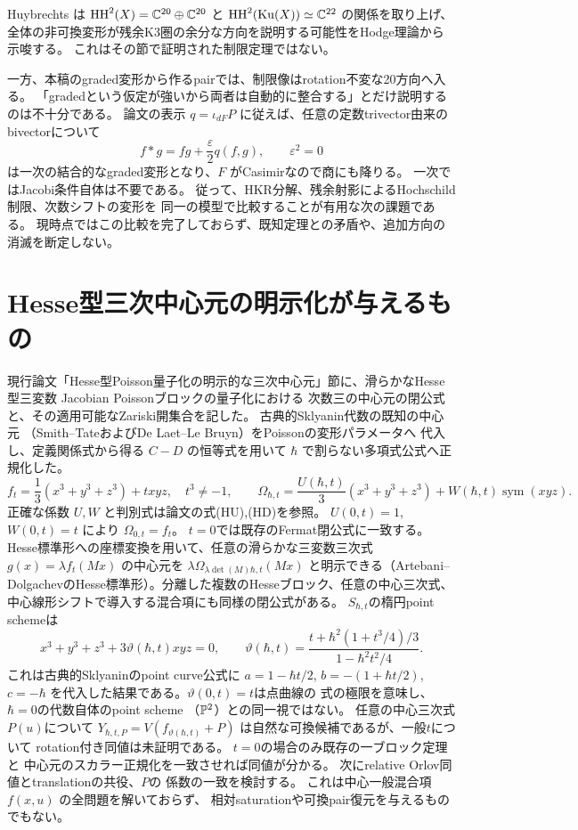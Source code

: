 Huybrechts \cite[Section 9]{HuyUpdate} は
\(\operatorname{HH}^2(X)=\mathbb C^{20}\oplus\mathbb C^{20}\) と
\(\operatorname{HH}^2(\operatorname{Ku}(X))\simeq\mathbb C^{22}\) の関係を取り上げ、
全体の非可換変形が残余K3圏の余分な方向を説明する可能性をHodge理論から示唆する。
これはその節で証明された制限定理ではない。

一方、本稿のgraded変形から作るpairでは、制限像はrotation不変な20方向へ入る。
「gradedという仮定が強いから両者は自動的に整合する」とだけ説明するのは不十分である。
論文の表示 \(q=\iota_{dF}P\) に従えば、任意の定数trivector由来のbivectorについて
\[
 f*g=fg+\frac\varepsilon2q(f,g),\qquad\varepsilon^2=0
\]
は一次の結合的なgraded変形となり、\(F\) がCasimirなので商にも降りる。
一次ではJacobi条件自体は不要である。
従って、HKR分解、残余射影によるHochschild制限、次数シフトの変形を
同一の模型で比較することが有用な次の課題である。
現時点ではこの比較を完了しておらず、既知定理との矛盾や、追加方向の消滅を断定しない。

\section{Hesse型三次中心元の明示化が与えるもの}
\label{sec:notes-hesse-explicit}
現行論文「Hesse型Poisson量子化の明示的な三次中心元」節に、滑らかなHesse型三変数
Jacobian Poissonブロックの量子化における
次数三の中心元の閉公式と、その適用可能なZariski開集合を記した。
古典的Sklyanin代数の既知の中心元
（Smith--TateおよびDe Laet--Le Bruyn）をPoissonの変形パラメータへ
代入し、定義関係式から得る $C-D$ の恒等式を用いて
$\hbar$ で割らない多項式公式へ正規化した。
\[
 f_t=\frac13(x^3+y^3+z^3)+txyz,\quad t^3\ne-1,\qquad
 \Omega_{\hbar,t}=
 \frac{U(\hbar,t)}3(x^3+y^3+z^3)
 +W(\hbar,t)\operatorname{sym}(xyz).
\]
正確な係数 $U,W$ と判別式は論文の式(HU),(HD)を参照。
$U(0,t)=1$, $W(0,t)=t$ により $\Omega_{0,t}=f_t$。
$t=0$では既存のFermat閉公式に一致する。
Hesse標準形への座標変換を用いて、任意の滑らかな三変数三次式 $g(x)=\lambda f_t(Mx)$ の中心元を $\lambda\Omega_{\lambda\det(M)\hbar,t}(Mx)$ と明示できる（Artebani--DolgachevのHesse標準形）。分離した複数のHesseブロック、任意の中心三次式、
中心線形シフトで導入する混合項にも同様の閉公式がある。
$S_{\hbar,t}$の楕円point schemeは
\[
 x^3+y^3+z^3+3\vartheta(\hbar,t)xyz=0,\qquad
 \vartheta(\hbar,t)=
 \frac{t+\hbar^2(1+t^3/4)/3}{1-\hbar^2t^2/4}.
\]
これは古典的Sklyaninのpoint curve公式に
$a=1-\hbar t/2$, $b=-(1+\hbar t/2)$, $c=-\hbar$
を代入した結果である。$\vartheta(0,t)=t$は点曲線の
式の極限を意味し、$\hbar=0$の代数自体のpoint scheme
（$\mathbb P^2$）との同一視ではない。
任意の中心三次式$P(u)$について
$Y_{\hbar,t,P}=V(f_{\vartheta(\hbar,t)}+P)$
は自然な可換候補であるが、一般$t$について
rotation付き同値は未証明である。
$t=0$の場合のみ既存の一ブロック定理と
中心元のスカラー正規化を一致させれば同値が分かる。
次にrelative Orlov同値とtranslationの共役、$P$の
係数の一致を検討する。
これは中心一般混合項 $f(x,u)$ の全問題を解いておらず、
相対saturationや可換pair復元を与えるものでもない。

